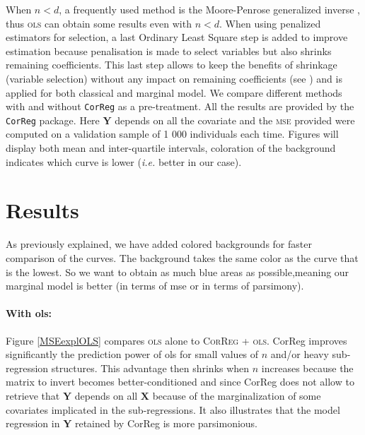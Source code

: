 \documentclass[12pt,a4paper]{report}
\begin{document}
	When $n<d$, a frequently used method is the Moore-Penrose \cite{katsikis2008fast} generalized inverse , thus \textsc{ols} can obtain some results even with $n<d$. %
	When using penalized estimators for selection, a last Ordinary Least Square step is added to improve estimation because penalisation is made to select variables but also shrinks remaining coefficients. This last step allows to keep the benefits of shrinkage (variable selection) without any impact on remaining coefficients (see \cite{SAM10088}) and is applied for both classical and marginal model.
	We compare different methods with and without {\tt CorReg} as a pre-treatment. All the results are provided by the {\tt CorReg} package. Here $\boldsymbol{Y}$ depends on all the covariate and the \textsc{mse} provided were computed on a validation sample of 1 000 individuals each time. Figures will display both mean and inter-quartile intervals, coloration of the background indicates which curve is lower ({\it i.e.} better in our case). \\
	\section{Results}	
	As previously explained, we have added colored backgrounds for faster comparison of the curves. The background takes the same color as the curve that is the lowest. So we want to obtain as much blue areas as possible,meaning our marginal model is better (in terms of {\sc mse} or in terms of parsimony).
\paragraph{With {\sc ols}:} Figure \ref{MSEexplOLS} %
	compares \textsc{ols} alone to \textsc{CorReg} + \textsc{ols}. 
{\sc CorReg} improves significantly the prediction power of {\sc ols} for small values of $n$ and/or heavy sub-regression structures. This advantage then shrinks when $n$ increases because the matrix to invert becomes better-conditioned and since {\sc CorReg} does not allow to retrieve that $\boldsymbol{Y}$ depends on all $\boldsymbol{X}$ because of the marginalization of some covariates implicated in the sub-regressions. It also illustrates that the model regression in $\boldsymbol{Y}$ retained by {\sc CorReg} is more parsimonious.%
\end{document}
